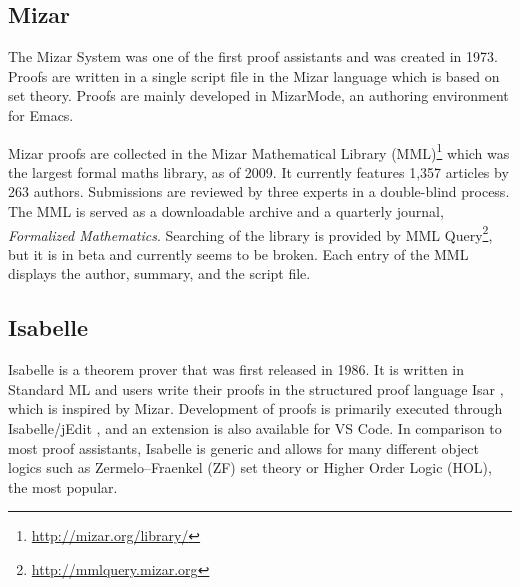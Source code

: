 \documentclass[bsc,frontabs,oneside,singlespacing,parskip,deptreport,logo]{infthesis}
\newcommand{\toupdate}[1]{} %
\begin{document}
\subsection{Mizar}
The Mizar System \cite{MizarOverview} was one of the first proof assistants and was created in 1973. Proofs are written in a single script file in the Mizar language which is based on set theory. Proofs are mainly developed in MizarMode, an authoring environment for Emacs.

Mizar proofs are collected in the Mizar Mathematical Library (MML)\footnote{\url{http://mizar.org/library/}} which was the largest formal maths library, as of 2009. It currently features 1,357 articles by 263 authors. Submissions are reviewed by three experts in a double-blind process. The MML is served as a downloadable archive and a quarterly journal, \textit{Formalized Mathematics}. Searching of the library is provided by MML Query\footnote{\url{http://mmlquery.mizar.org}}, but it is in beta and currently seems to be broken. Each entry of the MML displays the author, summary, and the script file.
\subsection{Isabelle}
Isabelle \cite{isabelle_system} is a theorem prover that was first released in 1986. It is written in Standard ML \cite{standardML} and users write their proofs in the structured proof language Isar \cite{isabelle_isar}, which is inspired by Mizar. Development of proofs is primarily executed through Isabelle/jEdit \cite{wenzel2012isabelle}, and an extension is also available for VS Code. In comparison to most proof assistants, Isabelle is generic and allows for many different object logics such as Zermelo–Fraenkel (ZF) set theory or Higher Order Logic (HOL), the most popular. 
\end{document}
